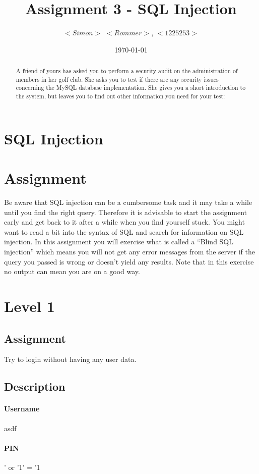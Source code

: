 \documentclass{scrartcl}
\title{Assignment 3 - SQL Injection}
\author{$<Simon>$ $<Rommer>$, $<1225253>$}
\date\today{}
\newcommand\solution[2]{{\paragraph{#1}#2}}
\begin{document}
	
	\maketitle
	
	\begin{abstract}
		
		A friend of yours has asked you to perform a security audit on the administration of members in her golf club. She asks you to test if there are any security issues concerning the MySQL database implementation. She gives you a short introduction to the system, but leaves you to find out other information you need for your test:
		
	\end{abstract}
	
	
	
	\section{SQL Injection}
	
	\section*{Assignment}
	Be aware that SQL injection can be a cumbersome task and it may take a while
	until you find the right query. Therefore it is advisable to start the
	assignment early and get back to it after a while when you find yourself stuck.
	You might want to read a bit into the syntax of SQL and search for information
	on SQL injection. In this assignment you will exercise what is called a ``Blind
	SQL injection'' which means you will not get any error messages from the server
	if the query you passed is wrong or doesn't yield any results. Note that in
	this exercise no output can mean you are on a good way. 
	
	
	
	\section*{Level 1}
	\subsection*{Assignment}
	Try to login without having any user data.
	
	\subsection*{Description}
	\solution{Username}{asdf}
	\solution{PIN}{' or '1' = '1} 
	
\end{document}
